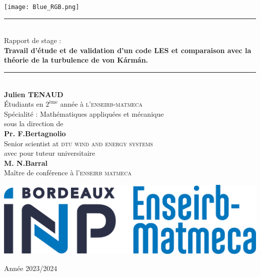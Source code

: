 \documentclass[12pt]{article}
\theoremstyle{plain}
\theoremstyle{remark}
\begin{document}
		
	
	\hypersetup{pdfborder=0 0 0}
	\begin{titlepage}
		
		
		\newcommand{\HRule}{\rule{\linewidth}{0.5mm}}
		\begin{center}
			
			\begin{minipage}[c]{.4\textwidth}
				\begin{center}
					\texttt{[image: Blue\_RGB.png]}
				\end{center}
			\end{minipage}
			
			\vspace{1cm}
			
			\HRule \\ [0.8cm]
			{\Large {Rapport de stage :} }\\ [0.8cm]
			{\huge \bf Travail d'étude et de validation d'un code LES et comparaison avec la théorie de la turbulence de von Kármán.} \\ [0.4cm]
			\HRule \\ [2cm]
			{\large \textbf{Julien TENAUD}} \\ [0.3cm]
			{ Étudiants en $2^{\text{ème}}$ année à \textsc{l'enseirb-matmeca}} \\ [0.2cm]
			{ Spécialité : Mathématiques appliquées et mécanique} \\ [1cm]
			{\small sous la direction de }\\ [0.6cm]
			{\large \textbf{Pr. F.Bertagnolio}} \\ [0.3cm]
			{ Senior scientist at \textsc{dtu wind and energy systems}} \\ [1cm]
			{\small avec pour tuteur universitaire }\\ [0.6cm]
			{\large \textbf{M. N.Barral}} \\ [0.3cm]
			{ Maître de conférence à l'\textsc{enseirb matmeca}}\\ [0.3cm]
			
			\vfill
			
			\begin{minipage}[c]{.4\textwidth}
				\begin{center}
					\includegraphics[width=1\textwidth]{logo_emkk.jpg}
				\end{center}
			\end{minipage}
		
			
			
			\vfill
			
			
			{Année 2023/2024}
			
			
		\end{center}
	\end{titlepage}
	
\end{document}
